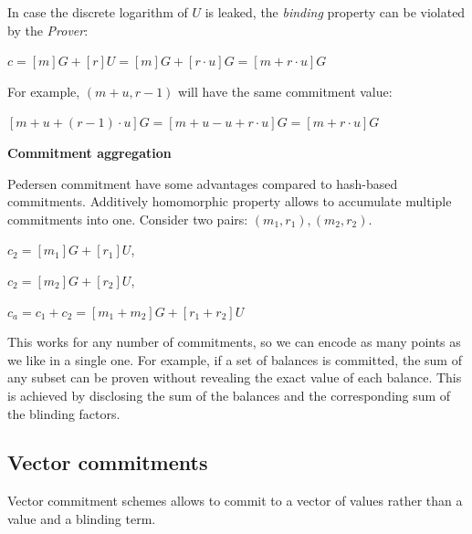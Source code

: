 \documentclass[../lecture-notes.tex]{subfiles}
\begin{document}
\begin{remark}
    In case the discrete logarithm of $U$ is leaked, the \textit{binding} property can be violated by the \textit{Prover}:

    \begin{center}
        $c = [m]G + [r]U = [m] G + [r \cdot u]G = [m + r \cdot u] G$
    \end{center}

    For example, $(m + u, r - 1)$ will have the same commitment value:

    \begin{center}
        $[m+u + (r-1) \cdot u] G = [m + u - u + r \cdot u] G = [m + r \cdot u] G$     
    \end{center}
    
        
\end{remark}

\vspace{0.5 cm}

\textbf{Commitment aggregation}

Pedersen commitment have some advantages compared to hash-based commitments.
Additively homomorphic property allows to accumulate multiple commitments into one.
Consider two pairs: $(m_1, r_1), (m_2, r_2)$.

\begin{center}
    $c_2 = [m_1]G + [r_1]U$,

    $c_2 = [m_2]G + [r_2]U$,

    $c_a = c_1 + c_2 = [m_1 + m_2]G + [r_1 + r_2]U$
\end{center}

This works for any number of commitments, so we can encode as many points as we like in a single one.
For example, if a set of balances is committed, the sum of any subset can be proven without revealing the exact value of each balance. 
This is achieved by disclosing the sum of the balances and the corresponding sum of the blinding factors.

\vspace{0.5 cm}

\subsection{Vector commitments}

Vector commitment schemes allows to commit to a vector of values rather than a value and a blinding term.

\vspace{0.5 cm}
\end{document}
